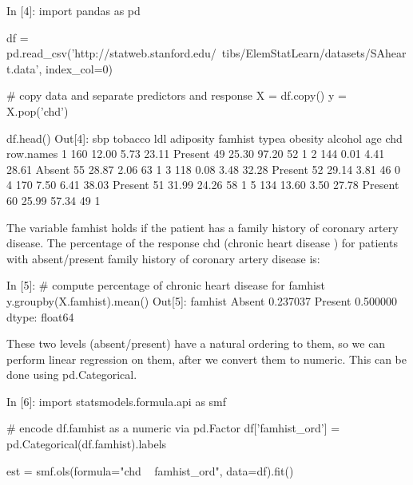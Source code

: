 \begin{frame}[fragile]
	\Large
In [4]:
import pandas as pd

df = pd.read_csv('http://statweb.stanford.edu/~tibs/ElemStatLearn/datasets/SAheart.data', index_col=0)

# copy data and separate predictors and response
X = df.copy()
y = X.pop('chd')
\end{frame}

\begin{frame}[fragile]
	\Large
df.head()
Out[4]:
sbp	tobacco	ldl	adiposity	famhist	typea	obesity	alcohol	age	chd
row.names										
1	160	12.00	5.73	23.11	Present	49	25.30	97.20	52	1
2	144	0.01	4.41	28.61	Absent	55	28.87	2.06	63	1
3	118	0.08	3.48	32.28	Present	52	29.14	3.81	46	0
4	170	7.50	6.41	38.03	Present	51	31.99	24.26	58	1
5	134	13.60	3.50	27.78	Present	60	25.99	57.34	49	1
\end{frame}

\begin{frame}[fragile]
	\Large
	The variable famhist holds if the patient has a family history of coronary artery disease. The percentage of the response chd (chronic heart disease ) for patients with absent/present family history of coronary artery disease is:

In [5]:
# compute percentage of chronic heart disease for famhist
y.groupby(X.famhist).mean()
Out[5]:
famhist
Absent     0.237037
Present    0.500000
dtype: float64
\end{frame}

\begin{frame}[fragile]
	\Large
These two levels (absent/present) have a natural ordering to them, so we can perform linear regression on them, after we convert them to numeric. This can be done using pd.Categorical.
\end{frame}

\begin{frame}[fragile]
	\Large
In [6]:
import statsmodels.formula.api as smf

# encode df.famhist as a numeric via pd.Factor
df['famhist_ord'] = pd.Categorical(df.famhist).labels

est = smf.ols(formula="chd ~ famhist_ord", data=df).fit()
\end{frame}

